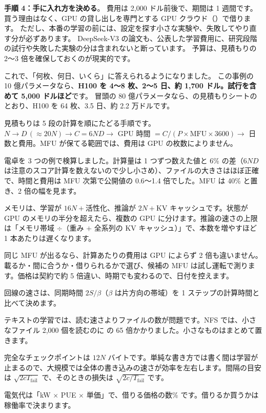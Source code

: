 \textbf{手順 4：手に入れ方を決める}。
費用は 2,000 ドル前後で、期間は 1 週間です。
買う理由はなく、GPU の貸し出しを専門とする GPU クラウド（）で借ります。
ただし、本番の学習の前には、設定を探す小さな実験や、失敗してやり直す分が必ずあります。
DeepSeek-V3 の論文\cite{liu2024deepseekv3}も、公表した学習費用に、研究段階の試行や失敗した実験の分は含まれないと断っています。
予算は、見積もりの 2〜3 倍を確保しておくのが現実的です。

これで、「何枚、何日、いくら」に答えられるようになりました。
この事例の 10 億パラメータなら、\textbf{H100 を 4〜8 枚、2〜5 日、約 1,700 ドル。試行を含めて 5,000 ドルほど}です。
冒頭の 80 億パラメータなら、の見積もりシートのとおり、H100 を 64 枚、3.5 日、約 2.2 万ドルです。

\begin{summary}
\item 見積もりは 5 段の計算を順にたどる手順です。$N \to D\,(\approx20N) \to C=6ND \to$ GPU 時間 $=C/(P\times\mathrm{MFU}\times3600) \to$ 日数と費用。MFU が保てる範囲では、費用は GPU の枚数によりません。
\item 電卓を 3 つの例で検算しました。計算量は 1 つずつ数えた値と 6\% の差（$6ND$ は注意のスコア計算を数えないので少し小さめ）、ファイルの大きさはほぼ正確で、時間と費用は MFU 次第で公開値の 0.6〜1.4 倍でした。MFU は 40\% と置き、2 倍の幅を見ます。
\item メモリは、学習が $16N+{}$活性化、推論が $2N+{}$KV キャッシュです。状態が GPU のメモリの半分を超えたら、複数の GPU に分けます。推論の速さの上限は「メモリ帯域 $\div$（重み $+$ 全系列の KV キャッシュ）」で、本数を増やすほど 1 本あたりは遅くなります。
\item 同じ MFU が出るなら、計算あたりの費用は GPU によらず 2 倍も違いません。載るか・間に合うか・借りられるかで選び、候補の MFU は試し運転で測ります。価格は契約で約 5 倍違い、時期でも変わるので、日付を控えます。
\item 回線の速さは、同期時間 $2S/\beta$（$\beta$ は片方向の帯域）を 1 ステップの計算時間と比べて決めます。
\item テキストの学習では、読む速さよりファイルの数が問題です。NFS では、小さなファイル 2,000 個を読むのに  の 65 倍かかりました。小さなものはまとめて置きます。
\item 完全なチェックポイントは $12N$ バイトです。単純な書き方では書く間は学習が止まるので、大規模では全体の書き込みの速さが効率を左右します。間隔の目安は $\sqrt{2cT_{\mathrm{fail}}}$ で、そのときの損失は $\sqrt{2c/T_{\mathrm{fail}}}$ です。
\item 電気代は「kW $\times$ PUE $\times$ 単価」で、借りる価格の数\% です。借りるか買うかは稼働率で決まります。
\end{summary}

